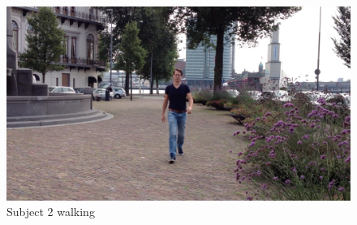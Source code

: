 \begin{figure}
\centering
  \includegraphics[width=1\textwidth]{./Figures/chapter6/data_collection/stills/roemer walk.png}
  \caption[Recording still 7]{Subject 2 walking}
\end{figure}